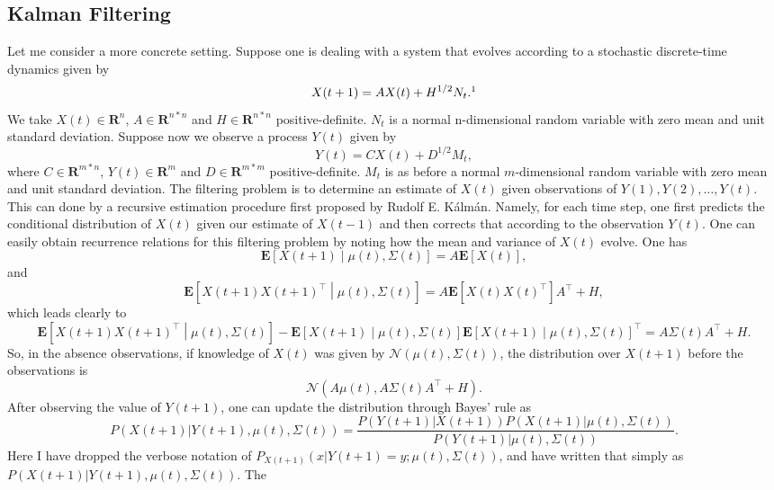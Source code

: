 {\subsection{Kalman Filtering}
\label{sec:kalman}
Let me consider a more concrete setting. Suppose one is dealing with a system that evolves according to a stochastic discrete-time dynamics given by
\[
X(t+1) = A X(t) + H^{1/2} N_t.\footnotemark
\]
We take $X(t) \in \mathbf{R}^n$, $A\in \mathbf{R}^{n*n}$ and $H \in \mathbf{R}^{n*n}$ positive-definite. $N_t$ is a normal n-dimensional random variable with zero mean and unit standard deviation. Suppose now we observe a process $Y(t)$ given by
\[
Y(t) = C X(t) + D^{1/2} M_t,
\]
where $C \in \mathbf{R}^{m*n}$, $Y(t) \in \mathbf{R}^m$ and $D\in \mathbf{R}^{m*m}$ positive-definite. $M_t$ is as before a normal $m$-dimensional random variable 
with zero mean and unit standard deviation. The filtering problem is to determine an estimate of $X(t)$ given observations of $Y(1),Y(2),\ldots,Y(t)$. This can done by a 
recursive estimation procedure first proposed by Rudolf E. K\'alm\'an. Namely, for each time step, one first predicts the conditional distribution of $X(t)$ given our estimate 
of $X(t-1)$ and then corrects that according to the observation $Y(t)$. One can easily obtain recurrence relations for this filtering problem by noting how the mean and 
variance of $X(t)$ evolve. One has
\[
\boldsymbol{E}\left[X(t+1)\middle| \mu(t),\Sigma(t)\right] = A\boldsymbol{E}\left[X(t)\right],
\]
and
\[
\boldsymbol{E}\left[X(t+1)X(t+1)^\top\middle| \mu(t),\Sigma(t)\right] = A\boldsymbol{E}\left[X(t)X(t)^\top\right]A^\top + H,
\]
which leads clearly to
\[
\boldsymbol{E}\left[X(t+1)X(t+1)^\top\middle|\mu(t),\Sigma(t)\right] - \boldsymbol{E}\left[X(t+1)\middle| \mu(t),\Sigma(t)\right] \boldsymbol{E}\left[X(t+1)\middle| \mu(t),\Sigma(t)\right] ^\top = A\Sigma(t)A^\top +H.
\]
So, in the absence observations, if knowledge of $X(t)$ was given by $\mathcal{N}(\mu(t),\Sigma(t))$, the distribution over $X(t+1)$ before the observations 
is\footnotemark  $$\mathcal{N}(A\mu(t),A\Sigma(t)A^\top+H).$$After observing the value of $Y(t+1)$, one can update the distribution through Bayes' rule as
\[
P(X(t+1)| Y(t+1), \mu(t),\Sigma(t)) =\frac{P(Y(t+1)|X(t+1))P(X(t+1)|\mu(t),\Sigma(t))}{P(Y(t+1)|\mu(t),\Sigma(t))}.
\]
Here I have dropped the verbose notation of $P_{X(t+1)}(x|Y(t+1)=y;\mu(t),\Sigma(t))$, and have written that simply as $P(X(t+1)| Y(t+1), \mu(t),\Sigma(t))$. The 
}
